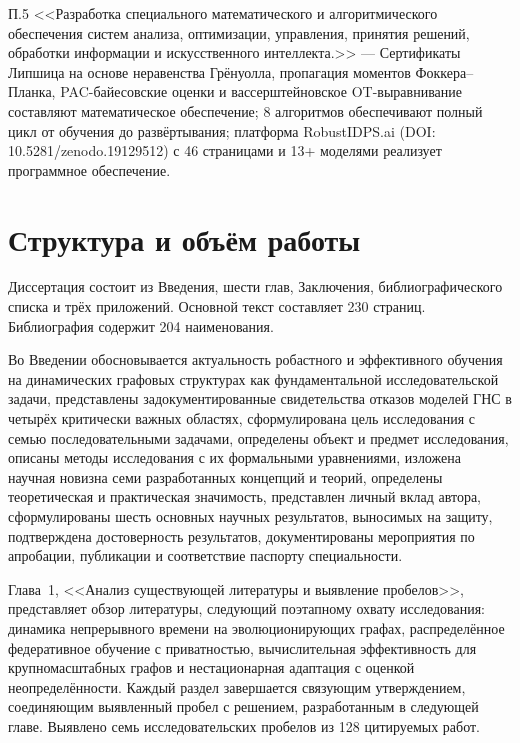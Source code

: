 \noindent П.5 <<Разработка специального математического и алгоритмического обеспечения систем анализа, оптимизации, управления, принятия решений, обработки информации и искусственного интеллекта.>> --- Сертификаты Липшица на основе неравенства Грёнуолла, пропагация моментов Фоккера--Планка, PAC-байесовские оценки и вассерштейновское OT-выравнивание составляют математическое обеспечение; 8 алгоритмов обеспечивают полный цикл от обучения до развёртывания; платформа RobustIDPS.ai (DOI: 10.5281/zenodo.19129512) с 46 страницами и 13+ моделями реализует программное обеспечение.


\section*{Структура и объём работы}

Диссертация состоит из Введения, шести глав, Заключения, библиографического списка и трёх приложений. Основной текст составляет 230 страниц. Библиография содержит 204 наименования.

Во Введении обосновывается актуальность робастного и эффективного обучения на динамических графовых структурах как фундаментальной исследовательской задачи, представлены задокументированные свидетельства отказов моделей ГНС в четырёх критически важных областях, сформулирована цель исследования с семью последовательными задачами, определены объект и предмет исследования, описаны методы исследования с их формальными уравнениями, изложена научная новизна семи разработанных концепций и теорий, определены теоретическая и практическая значимость, представлен личный вклад автора, сформулированы шесть основных научных результатов, выносимых на защиту, подтверждена достоверность результатов, документированы мероприятия по апробации, публикации и соответствие паспорту специальности.

Глава~1, <<Анализ существующей литературы и выявление пробелов>>, представляет обзор литературы, следующий поэтапному охвату исследования: динамика непрерывного времени на эволюционирующих графах, распределённое федеративное обучение с приватностью, вычислительная эффективность для крупномасштабных графов и нестационарная адаптация с оценкой неопределённости. Каждый раздел завершается связующим утверждением, соединяющим выявленный пробел с решением, разработанным в следующей главе. Выявлено семь исследовательских пробелов из 128 цитируемых работ.

